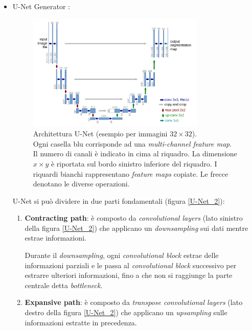             \begin{itemize}
                \item U-Net Generator %
                      \cite{ronneberger2015u}:
                    \begin{figure}[!h]
                        \centering \includegraphics[width=0.8\textwidth]{Images/Mitigation/U-Net_1.png}
                        \caption{Architettura U-Net (esempio per immagini $32\times32$). \\
                        Ogni casella blu corrisponde ad una \textit{multi-channel feature map}. Il numero di canali è indicato in cima al riquadro. La dimensione $x\times y$ è riportata sul bordo sinistro inferiore del riquadro.
                        I riquardi bianchi rappresentano \textit{feature maps} copiate. 
                        Le frecce denotano le diverse operazioni.}
                        \label{U-Net_1}
                    \end{figure}
                \newpage
                
                U-Net si può dividere in due parti fondamentali (figura \ref{U-Net_2}):
                    \begin{enumerate}
                        \item \textbf{Contracting path}: è composto da \textit{convolutional layers} (lato sinistro della figura \ref{U-Net_2}) che applicano un \textit{downsampling} sui dati mentre estrae informazioni.
                        
                        Durante il \textit{downsampling}, ogni \textit{convolutional block} estrae delle informazioni parziali e le passa al \textit{convolutional block} successivo per estrarre ulteriori informazioni, fino a che non si raggiunge la parte centrale detta \textit{bottleneck}.
                        \item \textbf{Expansive path}: è composto da \textit{transpose convolutional layers} (lato destro della figura \ref{U-Net_2}) che applicano un \textit{upsampling} sulle informazioni estratte in precedenza.
                        

\end{enumerate}
\end{itemize}

